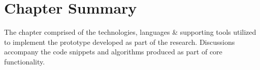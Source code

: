 

\section{Chapter Summary}
The chapter comprised of the technologies, languages \& supporting tools utilized to implement the prototype developed as part of the research. Discussions accompany the code snippets and algorithms produced as part of core functionality.
